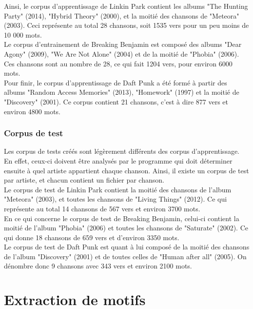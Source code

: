 \documentclass[a4paper]{article}
\begin{document}
	Ainsi, le corpus d'apprentissage de Linkin Park contient les albums "The Hunting Party" (2014), "Hybrid Theory" (2000), et la moitié des chansons de "Meteora" (2003). Ceci représente au total 28 chansons, soit 1535 vers pour un peu moins de 10 000 mots.\\
	
	Le corpus d'entrainement de Breaking Benjamin est composé des albums "Dear Agony" (2009), "We Are Not Alone" (2004) et de la moitié de "Phobia" (2006). Ces chansons sont au nombre de 28, ce qui fait 1204 vers, pour environ 6000 mots.\\
	
	Pour finir, le corpus d'apprentissage de Daft Punk a été formé à partir des albums "Random Access Memories" (2013), "Homework" (1997) et la moitié de "Discovery" (2001). Ce corpus contient 21 chansons, c'est à dire 877 vers et environ 4800 mots.
	
	\subsubsection{Corpus de test}
	
	Les corpus de tests créés sont légèrement différents des corpus d'apprentissage. En effet, ceux-ci doivent être analysés par le programme qui doit déterminer ensuite à quel artiste appartient chaque chanson. Ainsi, il existe un corpus de test par artiste, et chacun contient un fichier par chanson. \\
	
	Le corpus de test de Linkin Park contient la moitié des chansons de l'album "Meteora" (2003), et toutes les chansons de "Living Things" (2012). Ce qui représente au total 14 chansons de 567 vers et environ 3700 mots.\\
	
	En ce qui concerne le corpus de test de Breaking Benjamin, celui-ci contient la moitié de l'album "Phobia" (2006) et toutes les chansons de "Saturate" (2002). Ce qui donne 18 chansons de 659 vers et d'environ 3350 mots.\\
	
	Le corpus de test de Daft Punk est quant à lui composé de la moitié des chansons de l'album "Discovery" (2001) et de toutes celles de "Human after all" (2005). On dénombre donc 9 chansons avec 343 vers et environ 2100 mots.
	
	
	\section{Extraction de motifs}
	
\end{document}
